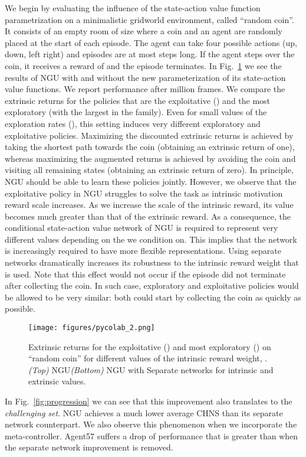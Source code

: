\documentclass{article}
\begin{document}
We begin by evaluating the influence of the state-action value function parametrization on a minimalistic gridworld environment, called ``random coin''.
It consists of an empty room of size  where a coin and an agent are randomly placed at the start of each episode. The agent can take four possible actions (up, down, left right) and episodes are at most  steps long. If the agent steps over the coin, it receives a reward of  and the episode terminates.
In Fig.~\ref{fig:randomcoinbar} we see the results of NGU with and without the new parameterization of its state-action value functions.
We report performance after  million frames. 
We compare the extrinsic returns for the policies that are the exploitative () and the most exploratory (with the largest  in the family).
Even for small values of the exploration rates (), this setting induces very different exploratory and exploitative policies.
Maximizing the discounted extrinsic returns is achieved by taking the shortest path towards the coin (obtaining an extrinsic return of one), whereas maximizing the augmented returns is achieved by avoiding the coin and visiting all remaining states (obtaining an extrinsic return of zero).
In principle, NGU should be able to learn these policies jointly.
However, we observe that the exploitative policy in NGU struggles to solve the task as intrinsic motivation reward scale increases. 
As we increase the scale of the intrinsic reward, its value becomes much greater than that of the extrinsic reward.
As a consequence, the conditional state-action value network of NGU is required to represent very different values depending on the  we condition on. This implies that the network is increasingly required to have more flexible representations. 
Using separate networks dramatically increases its robustness to the intrinsic reward weight that is used.
Note that this effect would not occur if the episode did not terminate after collecting the coin. In such case, exploratory and exploitative policies would be allowed to be very similar: both could start by collecting the coin as quickly as possible. 
\begin{figure}[!t]
    \centering
    \texttt{[image: figures/pycolab\_2.png]}
    \caption{Extrinsic returns for the exploitative () and most exploratory () on ``random coin'' for different values of the intrinsic reward weight, . \emph{(Top)} NGU\emph{(Bottom)} NGU with Separate networks for intrinsic and extrinsic values.} 
    \label{fig:randomcoinbar}
    \vspace{-3ex}
\end{figure}
In Fig.~\ref{fig:progression} we can see that this improvement also translates to the \emph{challenging set}. NGU achieves a much lower average CHNS than its separate network counterpart. We also observe this phenomenon when we incorporate the meta-controller. Agent57 suffers a drop of performance that is greater than  when the separate network improvement is removed.
\end{document}

